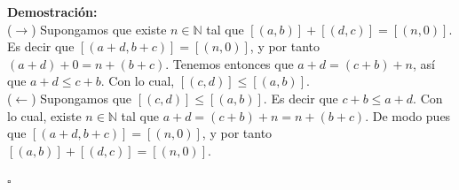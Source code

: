 \documentclass[10 pt]{article}
\begin{document}
\Large{\textbf{Demostración:} \\

($\rightarrow$) Supongamos que existe $n \in \mathbb N$ tal que $[(a,b)]+[(d,c)]=[(n,0)]$. Es decir que $[(a+d,b+c)]=[(n,0)]$, y por tanto $(a+d)+0=n+(b+c)$. Tenemos entonces que $a+d=(c+b)+n$, así que $a+d \leq c+b$. Con lo cual, $[(c,d)] \leq [(a,b)]$. \\

($\leftarrow$) Supongamos que $[(c,d)] \leq [(a,b)]$. Es decir que $c+b \leq a+d$. Con lo cual, existe $n \in \mathbb N$ tal que $a+d=(c+b)+n=n+(b+c)$. De modo pues que $[(a+d,b+c)]=[(n,0)]$, y por tanto $[(a,b)]+[(d,c)]=[(n,0)]$.} \\

\begin{flushright}
    $\square$
\end{flushright}
\end{document}
